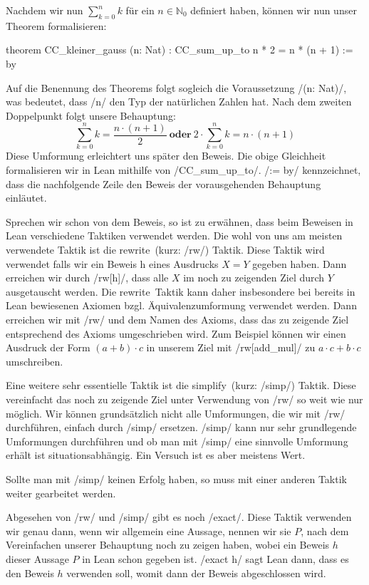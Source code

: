 \documentclass[10pt]{article}
\begin{document}
\noindent Nachdem wir nun $\sum_{k=0}^{n}k$ für ein $n\in \mathbb{N}_0$ definiert haben, können wir nun unser Theorem formalisieren:
\begin{leancode}
theorem CC_kleiner_gauss (n: Nat) : CC_sum_up_to n * 2 = n * (n + 1) := by
\end{leancode}
Auf die Benennung des Theorems folgt sogleich die Voraussetzung \lean/(n: Nat)/, was bedeutet, dass \lean/n/ den Typ der natürlichen Zahlen hat. Nach dem zweiten Doppelpunkt folgt unsere Behauptung: $$\sum_{k=0}^{n}k=\frac{n\cdot (n+1)}{2} 
~\textbf{oder}~2\cdot\sum_{k=0}^{n}k=n\cdot (n+1)$$
\noindent Diese Umformung erleichtert uns später den Beweis. Die obige Gleichheit formalisieren wir in Lean mithilfe von \lean/CC_sum_up_to/. \lean/:= by/ kennzeichnet, dass die nachfolgende Zeile den Beweis der vorausgehenden Behauptung einläutet.

\noindent Sprechen wir schon von dem Beweis, so ist zu erwähnen, dass beim Beweisen in Lean verschiedene Taktiken verwendet werden. Die wohl von uns am meisten verwendete Taktik ist die \glqq rewrite\grqq~(kurz: \lean/rw/) Taktik. Diese Taktik wird verwendet falls wir ein Beweis h eines Ausdrucks $X=Y$ gegeben haben. Dann erreichen wir durch \lean/rw[h]/, dass alle $X$ im noch zu zeigenden Ziel durch $Y$ ausgetauscht werden. Die \glqq rewrite\grqq~Taktik kann daher insbesondere bei bereits in Lean bewiesenen Axiomen bzgl. Äquivalenzumformung verwendet werden. Dann erreichen wir mit \lean/rw/ und dem Namen des Axioms, dass das zu zeigende Ziel entsprechend des Axioms umgeschrieben wird. Zum Beispiel können wir einen Ausdruck der Form $(a+b)\cdot c$ in unserem Ziel mit \lean/rw[add_mul]/ zu $a\cdot c+b\cdot c$ umschreiben.

\noindent Eine weitere sehr essentielle Taktik ist die \glqq simplify\grqq~(kurz: \lean/simp/) Taktik. Diese vereinfacht das noch zu zeigende Ziel unter Verwendung von \lean/rw/ so weit wie nur möglich. Wir können grundsätzlich nicht alle Umformungen, die wir mit \lean/rw/ durchführen, einfach durch \lean/simp/ ersetzen. \lean/simp/ kann nur sehr grundlegende Umformungen durchführen und ob man mit \lean/simp/ eine sinnvolle Umformung erhält ist situationsabhängig. Ein Versuch ist es aber meistens Wert.\par
\noindent Sollte man mit \lean/simp/ keinen Erfolg haben, so muss mit einer anderen Taktik weiter gearbeitet werden.

\noindent Abgesehen von \lean/rw/ und \lean/simp/ gibt es noch \lean/exact/. Diese Taktik verwenden wir genau dann, wenn wir allgemein eine Aussage, nennen wir sie $P$, nach dem Vereinfachen unserer Behauptung noch zu zeigen haben, wobei ein Beweis $h$ dieser Aussage $P$ in Lean schon gegeben ist. \lean/exact h/ sagt Lean dann, dass es den Beweis $h$ verwenden soll, womit dann der Beweis abgeschlossen wird.\\
\end{document}
